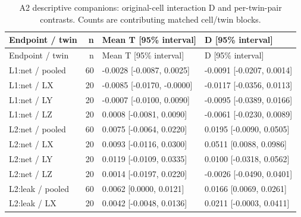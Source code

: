 \begin{longtable}{@{}p{1.8in}rl l@{}}
\caption{A2 descriptive companions: original-cell interaction D and per-twin-pair contrasts. Counts are contributing matched cell/twin blocks.}\\
\toprule Endpoint / twin & n & Mean T [95\% interval] & D [95\% interval]\\\midrule\endfirsthead
\toprule Endpoint / twin & n & Mean T [95\% interval] & D [95\% interval]\\\midrule\endhead
\bottomrule\endfoot
L1:net / pooled & 60 & -0.0028 [-0.0087, 0.0025] & -0.0091 [-0.0207, 0.0014]\\
L1:net / LX & 20 & -0.0085 [-0.0170, -0.0000] & -0.0117 [-0.0356, 0.0113]\\
L1:net / LY & 20 & -0.0007 [-0.0100, 0.0090] & -0.0095 [-0.0389, 0.0166]\\
L1:net / LZ & 20 & 0.0008 [-0.0081, 0.0090] & -0.0061 [-0.0230, 0.0089]\\
L2:net / pooled & 60 & 0.0075 [-0.0064, 0.0220] & 0.0195 [-0.0090, 0.0505]\\
L2:net / LX & 20 & 0.0093 [-0.0116, 0.0300] & 0.0511 [0.0088, 0.0986]\\
L2:net / LY & 20 & 0.0119 [-0.0109, 0.0335] & 0.0100 [-0.0318, 0.0562]\\
L2:net / LZ & 20 & 0.0014 [-0.0197, 0.0220] & -0.0026 [-0.0490, 0.0401]\\
L2:leak / pooled & 60 & 0.0062 [0.0000, 0.0121] & 0.0166 [0.0069, 0.0261]\\
L2:leak / LX & 20 & 0.0042 [-0.0048, 0.0136] & 0.0211 [-0.0003, 0.0411]\\

\end{longtable}
